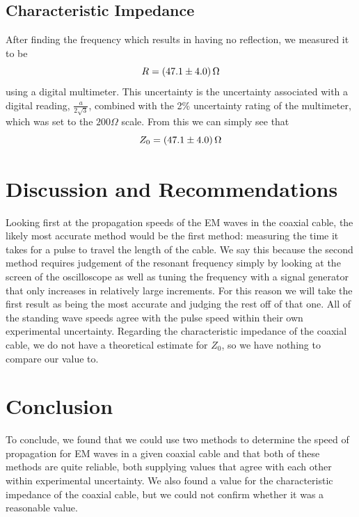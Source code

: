 \documentclass[12pt]{article}
\numberwithin{equation}{section}
\numberwithin{figure}{section}
\begin{document}
    \subsection{Characteristic Impedance}\label{sec:CharacteristicImpedanceResults}
    After finding the frequency which results in having no reflection, we measured it to be 
    \begin{equation*}
        R=\SI{47.1\pm4.0}{\ohm}
    \end{equation*}
    using a digital multimeter. This uncertainty is the uncertainty associated with a digital 
    reading, $\frac{a}{2\sqrt3}$, combined with the 2\% uncertainty rating of the multimeter, 
    which was set to the $200\Omega$ scale. From this we can simply see that 
    \begin{equation*}
        Z_0=\SI{47.1\pm4.0}{\ohm}
    \end{equation*}

    \section{Discussion and Recommendations}\label{sec:DiscussionRecommendations}
    Looking first at the propagation speeds of the EM waves in the coaxial cable, the likely 
    most accurate method would be the first method: measuring the time it takes for a pulse 
    to travel the length of the cable. We say this because the second method requires 
    judgement of the resonant frequency simply by looking at the screen of the oscilloscope as 
    well as tuning the frequency with a signal generator that only increases in relatively 
    large increments. For this reason we will take the first result as being the most accurate 
    and judging the rest off of that one. \newline
    All of the standing wave speeds agree with the pulse speed within their own experimental 
    uncertainty.\newline
    \newline
    Regarding the characteristic impedance of the coaxial cable, we do not have a theoretical 
    estimate for $Z_0$, so we have nothing to compare our value to.

    \section{Conclusion}\label{sec:Conclusion}
    To conclude, we found that we could use two methods to determine the speed of propagation 
    for EM waves in a given coaxial cable and that both of these methods are quite reliable, both 
    supplying values that agree with each other within experimental uncertainty. We also 
    found a value for the characteristic impedance of the coaxial cable, but we could not 
    confirm whether it was a reasonable value.
    
\end{document}
